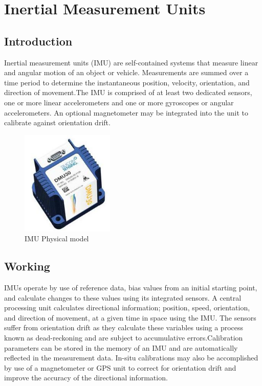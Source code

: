 \section{Inertial Measurement Units}
\label{imusection}

\subsection{Introduction}

Inertial measurement units (IMU) are self-contained systems that measure linear and angular motion of an object or vehicle. Measurements are summed over a time period to determine the instantaneous position, velocity, orientation, and direction of movement.The IMU is comprised of at least two dedicated sensors, one or more linear accelerometers and one or more gyroscopes or angular accelerometers. An optional magnetometer may be integrated into the unit to calibrate against orientation drift.

\begin{figure}[!htb]
\includegraphics[width=\textwidth,height=5cm,keepaspectratio]{./figures/IMU.jpg}
\caption{IMU Physical model~\cite{StarElec}}
\label{fig:IMU Model}
\end{figure}

\subsection{Working}
IMUs operate by use of reference data, bias values from an initial starting point, and calculate changes to these values using its integrated sensors. A central processing unit calculates directional information; position, speed, orientation, and direction of movement, at a given time in space using the IMU. The sensors suffer from orientation drift as they calculate these variables using a process known as dead-reckoning and are subject to accumulative errors.Calibration parameters can be stored in the memory of an IMU and are automatically reflected in the measurement data. In-situ calibrations may also be accomplished by use of a magnetometer or GPS unit to correct for orientation drift and improve the accuracy of the directional information.
 
